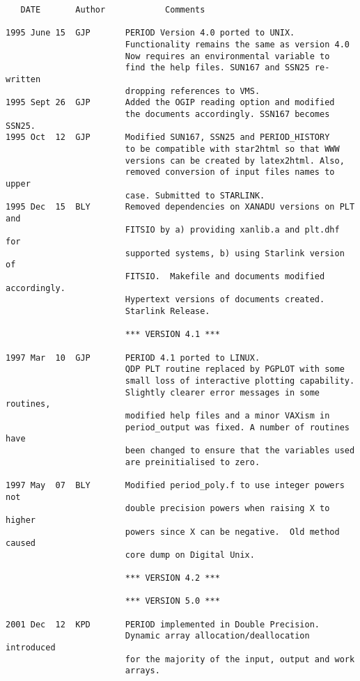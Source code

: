 \begin{verbatim}
   DATE       Author            Comments                                                      

1995 June 15  GJP       PERIOD Version 4.0 ported to UNIX. 
                        Functionality remains the same as version 4.0 
                        Now requires an environmental variable to  
                        find the help files. SUN167 and SSN25 re-written 
                        dropping references to VMS. 
1995 Sept 26  GJP       Added the OGIP reading option and modified
                        the documents accordingly. SSN167 becomes SSN25.
1995 Oct  12  GJP       Modified SUN167, SSN25 and PERIOD_HISTORY
                        to be compatible with star2html so that WWW
                        versions can be created by latex2html. Also,
                        removed conversion of input files names to upper
                        case. Submitted to STARLINK.
1995 Dec  15  BLY       Removed dependencies on XANADU versions on PLT and
                        FITSIO by a) providing xanlib.a and plt.dhf for
                        supported systems, b) using Starlink version of 
                        FITSIO.  Makefile and documents modified accordingly.
                        Hypertext versions of documents created.
                        Starlink Release.
                   
                        *** VERSION 4.1 *** 
	                   
1997 Mar  10  GJP       PERIOD 4.1 ported to LINUX. 
                        QDP PLT routine replaced by PGPLOT with some
                        small loss of interactive plotting capability.
                        Slightly clearer error messages in some routines,
                        modified help files and a minor VAXism in 
                        period_output was fixed. A number of routines have
                        been changed to ensure that the variables used
                        are preinitialised to zero.
 
1997 May  07  BLY       Modified period_poly.f to use integer powers not
                        double precision powers when raising X to higher
                        powers since X can be negative.  Old method caused
                        core dump on Digital Unix.

                        *** VERSION 4.2 ***

                        *** VERSION 5.0 ***

2001 Dec  12  KPD       PERIOD implemented in Double Precision.
                        Dynamic array allocation/deallocation introduced
                        for the majority of the input, output and work
                        arrays.
   

\end{verbatim}



